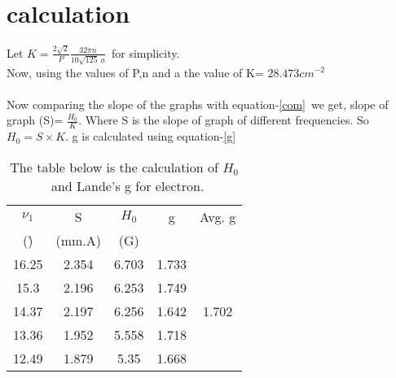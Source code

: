\section{calculation}
\noindent Let $K=\frac{2\sqrt{2}}{P}\frac{32\pi n}{10\sqrt{125}\ a}$\ for simplicity.\\ Now, using the values of P,n and a the value of K= $28.473cm^{-2}$\\ \\
Now comparing the slope of the graphs with equation-\eqref{com}\ we get, slope of graph (S)= $\frac{H_0}{K}$. Where S is the slope of graph of different frequencies. So $H_0=S\times K$. g is calculated using equation-\eqref{g}
\begin{table}[H]
	\centering
	\caption{The table below is the calculation of $H_0$\ and Lande's g for electron.}
	\label{tabcal}
	\begin{tabular}{|c|c|c|c|c|}
		\hline
		$\nu_1$                                        & S                     &$ H_0 $                    & g                     & Avg. g                  \\ %
		(\h) & (mm.A) & (G) &  &   \\ \hline
		16.25                                     & 2.354                       & 6.703                    & 1.733                 & \multirow{5}{*}{1.702} \\ \cline{1-4}
		15.3                                      & 2.196                       & 6.253                    & 1.749                 &                        \\ \cline{1-4}
		14.37                                     & 2.197                       & 6.256                    & 1.642                 &                        \\ \cline{1-4}
		13.36                                     & 1.952                       & 5.558                    & 1.718                 &                        \\ \cline{1-4}
		12.49                                     & 1.879                       & 5.35                     & 1.668                 &                        \\ \hline
	\end{tabular}
\end{table}
